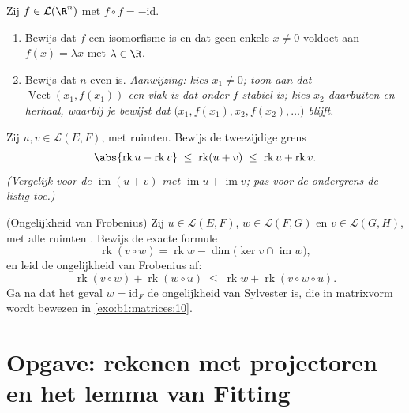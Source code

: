 \begin{exercise}[$\star\star\star$]\label{exo:b1:linmaps:10}
Zij $f \in \mathcal{L}(\R^n)$ met $f \circ f = -\mathrm{id}$.
\begin{enumerate}
  \item Bewijs dat $f$ een isomorfisme is en dat geen enkele $x
        \neq 0$ voldoet aan $f(x) = \lambda x$ met $\lambda \in
        \R$.
  \item Bewijs dat $n$ even is. \emph{Aanwijzing: kies $x_1 \neq
        0$; toon aan dat $\operatorname{Vect}(x_1, f(x_1))$ een
        vlak is dat onder $f$ stabiel is; kies $x_2$ daarbuiten en
        herhaal, waarbij je bewijst dat $\bigl(x_1, f(x_1), x_2,
        f(x_2), \dots\bigr)$  blijft.}
\end{enumerate}
\end{exercise}

\begin{exercise}[$\star\star$]\label{exo:b1:linmaps:11}
Zij $u, v \in \mathcal{L}(E, F)$, met  ruimten.
Bewijs de tweezijdige grens
\[
\abs{\operatorname{rk} u - \operatorname{rk} v}
\;\leq\; \operatorname{rk}(u + v)
\;\leq\; \operatorname{rk} u + \operatorname{rk} v .
\]
\emph{(Vergelijk voor de  $\operatorname{im}(u+v)$ met
$\operatorname{im} u + \operatorname{im} v$; pas voor de
ondergrens de  listig toe.)}
\end{exercise}

\begin{exercise}[$\star\star\star$]\label{exo:b1:linmaps:12}
(Ongelijkheid van Frobenius) Zij $u \in \mathcal{L}(E, F)$, $w \in
\mathcal{L}(F, G)$ en $v \in \mathcal{L}(G, H)$, met alle ruimten
. Bewijs de exacte formule
\[
\operatorname{rk}(v \circ w) = \operatorname{rk} w -
\dim\bigl(\ker v \cap \operatorname{im} w\bigr),
\]
en leid de ongelijkheid van Frobenius af:
\[
\operatorname{rk}(v \circ w) + \operatorname{rk}(w \circ u)
\;\leq\; \operatorname{rk} w + \operatorname{rk}(v \circ w \circ
u) .
\]
Ga na dat het geval $w = \mathrm{id}_F$ de ongelijkheid van
Sylvester is, die in matrixvorm wordt bewezen in
\cref{exo:b1:matrices:10}.
\end{exercise}

\section{Opgave: rekenen met projectoren en het lemma van Fitting}

